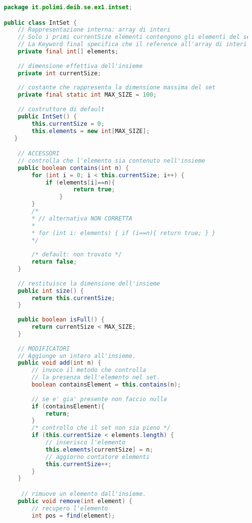 \documentclass{article}
\begin{document}
\begin{lstlisting}[language=Java,escapechar=|]
package it.polimi.deib.se.ex1.intset;

public class IntSet {
    // Rappresentazione interna: array di interi
    // Solo i primi currentSize elementi contengono gli elementi del set
    // La Keyword final specifica che il reference all'array di interi non puo' cambiare durante l'esecuzione: una volta inizializzato l'array non e' possibile associare il reference elements a un nuovo array
    private final int[] elements;
    
    // dimensione effettiva dell'insieme
    private int currentSize;
    
    // costante che rappresenta la dimensione massima del set
    private final static int MAX_SIZE = 100;
    
    // costruttore di default
    public IntSet() {
        this.currentSize = 0;
        this.elements = new int[MAX_SIZE];
   }

    // ACCESSORI
    // controlla che l'elemento sia contenuto nell'insieme
    public boolean contains(int n) {
	    for (int i = 0; i < this.currentSize; i++) {
		    if (elements[i]==n){
		            return true;
                }
	    }
	    /*
	    * // alternativa NON CORRETTA
	    *
	    * for (int i: elements) { if (i==n){ return true; } }
	    */
	
	    /* default: non trovato */
	    return false;
    }
    
    // restituisce la dimensione dell'insieme
    public int size() {
        return this.currentSize;
    }
    
    public boolean isFull() {
        return currentSize < MAX_SIZE;
    }
    
    // MODIFICATORI
    // Aggiunge un intero all'insieme.
    public void add(int n) {
        // invoco il metodo che controlla
        // la presenza dell'elemento nel set.
        boolean containsElement = this.contains(n);
        
        // se e' gia' presente non faccio nulla
        if (containsElement){
		    return;
    	}
    	/* controllo che il set non sia pieno */
    	if (this.currentSize < elements.length) {
    	    // inserisco l'elemento
    	    this.elements[currentSize] = n;
    	    // aggiorno contatore elementi
    	    this.currentSize++;
    	} 
    }

     // rimuove un elemento dall'insieme.
    public void remove(int element) {
        // recupero l'elemento
        int pos = find(element);
	

\end{lstlisting}
\end{document}

